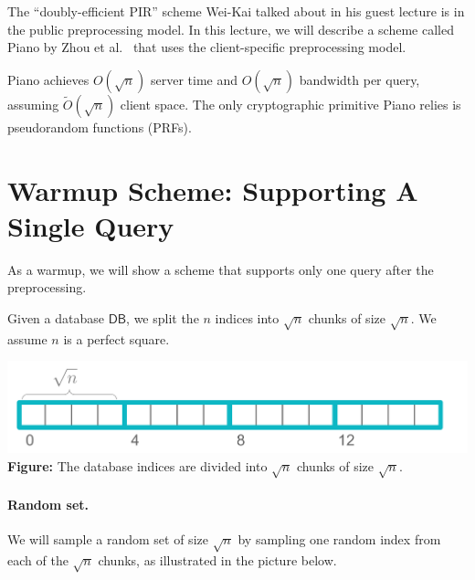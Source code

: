 The ``doubly-efficient PIR'' 
scheme Wei-Kai talked about in his guest lecture 
is in the public preprocessing model.
In this lecture, 
we will describe a scheme called Piano by Zhou et al.~\cite{zhou2023piano} 
that uses the client-specific preprocessing model.


Piano achieves $O(\sqrt{n})$ server time and $O(\sqrt{n})$ bandwidth per query, 
assuming $\widetilde{O}(\sqrt{n})$ client space. 
The only cryptographic primitive Piano relies is pseudorandom functions (PRFs).


\section{Warmup Scheme: Supporting A Single Query}
As a warmup, we will show a scheme that supports only one query after the preprocessing. 


Given a database $\mathsf{DB}$, we split the $n$ indices 
into $\sqrt{n}$ chunks of size $\sqrt{n}$.
We assume $n$ is a perfect square.

\begin{center}
    \includegraphics[scale=0.6]{chunks}\\
{\bf Figure:} The database indices are divided into $\sqrt{n}$ chunks of size $\sqrt{n}$. 
\end{center}

\paragraph{Random set.}
We will sample a random set 
of size $\sqrt{n}$ by sampling one random index from
each of the $\sqrt{n}$ chunks, as illustrated in the picture below. 


